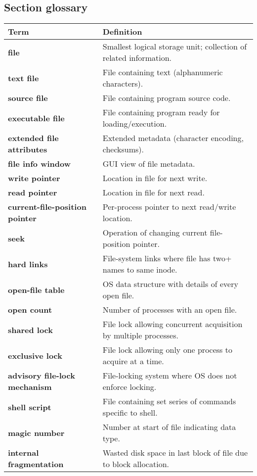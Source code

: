 \subsection*{Section glossary}
\begin{tabular}{p{}p{}}
    \toprule
    \textbf{Term} & \textbf{Definition} \\
    \midrule
    \textbf{file} & Smallest logical storage unit; collection of related information. \\
    \textbf{text file} & File containing text (alphanumeric characters). \\
    \textbf{source file} & File containing program source code. \\
    \textbf{executable file} & File containing program ready for loading/execution. \\
    \textbf{extended file attributes} & Extended metadata (character encoding, checksums). \\
    \textbf{file info window} & GUI view of file metadata. \\
    \textbf{write pointer} & Location in file for next write. \\
    \textbf{read pointer} & Location in file for next read. \\
    \textbf{current-file-position pointer} & Per-process pointer to next read/write location. \\
    \textbf{seek} & Operation of changing current file-position pointer. \\
    \textbf{hard links} & File-system links where file has two+ names to same inode. \\
    \textbf{open-file table} & OS data structure with details of every open file. \\
    \textbf{open count} & Number of processes with an open file. \\
    \textbf{shared lock} & File lock allowing concurrent acquisition by multiple processes. \\
    \textbf{exclusive lock} & File lock allowing only one process to acquire at a time. \\
    \textbf{advisory file-lock mechanism} & File-locking system where OS does not enforce locking. \\
    \textbf{shell script} & File containing set series of commands specific to shell. \\
    \textbf{magic number} & Number at start of file indicating data type. \\
    \textbf{internal fragmentation} & Wasted disk space in last block of file due to block allocation. \\
    \bottomrule
\end{tabular}
